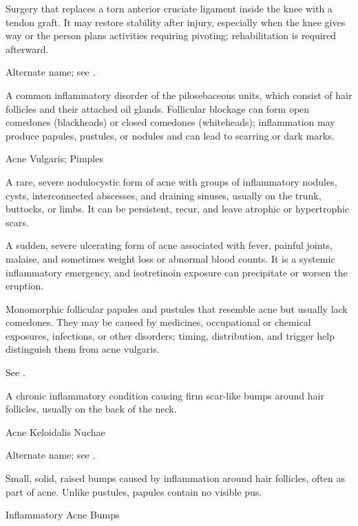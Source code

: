  Surgery that replaces a torn anterior cruciate ligament inside the knee with a tendon graft. It may restore stability after injury, especially when the knee gives way or the person plans activities requiring pivoting; rehabilitation is required afterward.

 Alternate name; see .

 A common inflammatory disorder of the pilosebaceous units, which consist of hair follicles and their
attached oil glands. Follicular blockage can form open comedones (blackheads) or closed comedones
(whiteheads); inflammation may produce papules, pustules, or nodules and can lead to scarring or dark marks.

\synonyms
Acne Vulgaris; Pimples

 A rare, severe nodulocystic form of acne with groups of inflammatory nodules, cysts, interconnected abscesses, and draining sinuses, usually on the trunk, buttocks, or limbs. It can be persistent, recur, and leave atrophic or hypertrophic scars.

 A sudden, severe ulcerating form of acne associated with fever, painful joints, malaise, and sometimes weight loss or abnormal blood counts. It is a systemic inflammatory emergency, and isotretinoin exposure can precipitate or worsen the eruption.

 Monomorphic follicular papules and pustules that resemble acne but usually lack comedones. They may be caused by medicines, occupational or chemical exposures, infections, or other disorders; timing, distribution, and trigger help distinguish them from acne vulgaris.

 See .

 A chronic inflammatory condition causing firm scar-like bumps around hair follicles, usually on the back of the neck.

\synonyms
Acne Keloidalis Nuchae

 Alternate name; see .

 Small, solid, raised bumps caused by inflammation around hair follicles, often as part of acne. Unlike pustules, papules contain no visible pus.

\synonyms
Inflammatory Acne Bumps

